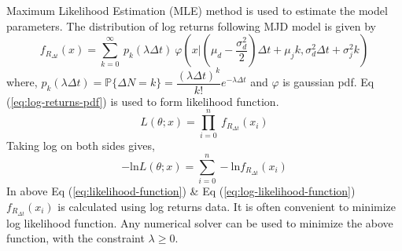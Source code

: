 \documentclass[paper.tex]{subfiles}
\begin{document}
    Maximum Likelihood Estimation (MLE) method is used to estimate the model parameters.
    The distribution of log returns following MJD model is given by 
    \begin{equation}
        f_{R_{\Delta t}}(x) = \sum_{k=0}^{\infty} ~ p_{k}(\lambda \Delta t) ~  \varphi(x | (\mu_{d} - \dfrac{\sigma_{d}^{2}}{2} )\Delta t + \mu_{j}k, \sigma_{d}^{2}\Delta t + \sigma_{j}^{2}k)
        \label{eq:log-returns-pdf}
    \end{equation}
    where, $ p_{k}(\lambda \Delta t) = \mathbb{P} \{\Delta N = k \} = \dfrac{(\lambda \Delta t)^{k}}{k!} e^{-\lambda \Delta t} $ and $ \varphi $ is gaussian pdf.
    Eq (\ref{eq:log-returns-pdf}) is used to form likelihood function.
    \begin{equation}
        L(\theta;x) = \prod_{i=0}^{n} ~ f_{R_{\Delta t}}(x_{i})
        \label{eq:likelihood-function}
    \end{equation}
    Taking log on both sides gives,
    \begin{equation}
        -\text{ln} L(\theta;x) = \sum_{i=0}^{n} -\text{ln} f_{R_{\Delta t}}(x_{i})
        \label{eq:log-likelihood-function}
    \end{equation}
    In above Eq (\ref{eq:likelihood-function}) \& Eq (\ref{eq:log-likelihood-function}) $ f_{R_{\Delta t}}(x_{i}) $ is calculated using log returns data.
    It is often convenient to minimize log likelihood function. Any numerical solver can be used to minimize the above function, with the constraint $ \lambda \geq 0 $.
\end{document}
